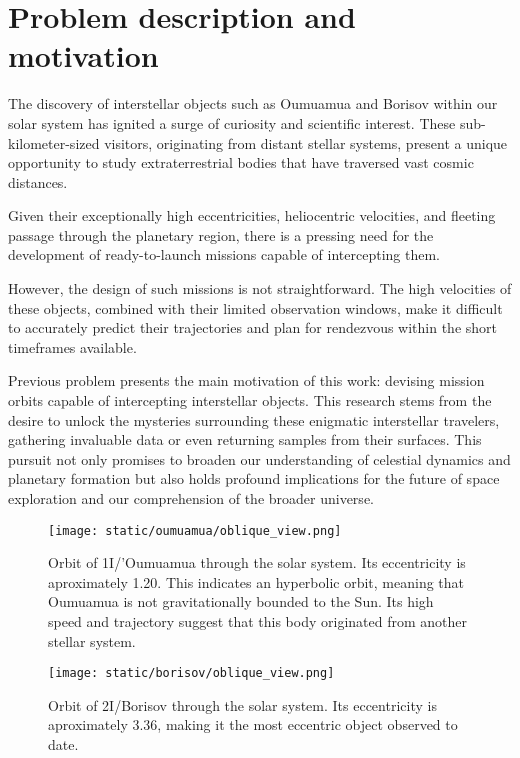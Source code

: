 \section{Problem description and motivation}

The discovery of interstellar objects such as Oumuamua and Borisov within our
solar system has ignited a surge of curiosity and scientific interest. These
sub-kilometer-sized visitors, originating from distant stellar systems, present
a unique opportunity to study extraterrestrial bodies that have traversed vast
cosmic distances. 

Given their exceptionally high eccentricities, heliocentric velocities, and
fleeting passage through the planetary region, there is a pressing need for the
development of ready-to-launch missions capable of intercepting them.

However, the design of such missions is not straightforward. The high velocities
of these objects, combined with their limited observation windows, make it
difficult to accurately predict their trajectories and plan for rendezvous
within the short timeframes available.

Previous problem presents the main motivation of this work: devising mission
orbits capable of intercepting interstellar objects. This research stems from
the desire to unlock the mysteries surrounding these enigmatic interstellar
travelers, gathering invaluable data or even returning samples from their
surfaces. This pursuit not only promises to broaden our understanding of
celestial dynamics and planetary formation but also holds profound implications
for the future of space exploration and our comprehension of the broader
universe.

\begin{figure}[H]
  \centering
  \texttt{[image: static/oumuamua/oblique\_view.png]}
  \caption[1I/'Oumuamua orbit through the solar system]{
    Orbit of 1I/'Oumuamua through the solar system. Its eccentricity is
    aproximately 1.20. This indicates an hyperbolic orbit, meaning that
    Oumuamua is not gravitationally bounded to the Sun. Its high speed and
    trajectory suggest that this body originated from another stellar system.
  }
  \label{fig:oumuamua_orbit}
\end{figure}

\begin{figure}[H]
  \centering
  \texttt{[image: static/borisov/oblique\_view.png]}
  \caption[2I/Borisov orbit through the solar system]{
    Orbit of 2I/Borisov through the solar system. Its eccentricity is
    aproximately 3.36, making it the most eccentric object observed to date.
  }
  \label{fig:borisov_orbit}
\end{figure}
